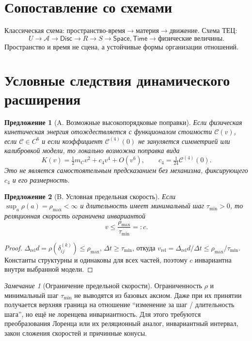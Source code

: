\documentclass[12pt,a4paper,oneside]{book}
\theoremstyle{definition}
\theoremstyle{plain}
\newtheorem{proposition}{Предложение}[chapter]
\theoremstyle{remark}
\newtheorem{remark}{Замечание}[chapter]
\newcommand{\Whole}{U}
\newcommand{\Parts}{\mathcal A}
\newcommand{\Rel}{R}
\newcommand{\State}{S}
\newcommand{\norm}{\rho}
\newcommand{\Disc}{\mathsf{Disc}}
\newcommand{\Space}{\mathsf{Space}}
\newcommand{\Time}{\mathsf{Time}}
\newcommand{\Cost}{\mathcal C}
\begin{document}
\section{Сопоставление со схемами}

Классическая схема: $\text{пространство-время}\to\text{материя}\to\text{движение}$.
Схема ТЕЦ:
\[
\Whole\to\Parts\to\Disc\to\Rel\to\State\to\Space,\Time\to\text{физические величины}.
\]
Пространство и время не сцена, а устойчивые формы организации отношений.

\section{Условные следствия динамического расширения}

\begin{proposition}[A. Возможные высокопорядковые поправки]
Если физическая кинетическая энергия отождествляется с функционалом стоимости
$\Cost(v)$, если $\Cost\in C^6$ и если коэффициент $\Cost^{(4)}(0)$ не зануляется
симметрией или калибровкой модели, то локально возможна поправка вида
\[
K(v)=\tfrac12 m_Cv^2+c_4v^4+O(v^6),
\qquad
c_4=\tfrac1{24}\Cost^{(4)}(0).
\]
Это не является самостоятельным предсказанием без механизма, фиксирующего $c_4$ и
его размерность.
\end{proposition}

\begin{proposition}[B. Условная предельная скорость]
Если $\sup_a\norm(a)=\norm_{\max}<\infty$ и длительность имеет минимальный шаг
$\tau_{\min}>0$, то реляционная скорость ограничена инвариантой
\[
v\le\frac{\norm_{\max}}{\tau_{\min}}=:c.
\]
\end{proposition}

\begin{proof}
$\Delta_{\mathrm{rel}}d=\norm(\delta_{ij}^{(k)})\le\norm_{\max}$,
$\Delta t\ge\tau_{\min}$, откуда
$v_{\mathrm{rel}}=\Delta_{\mathrm{rel}}d/\Delta t\le\norm_{\max}/\tau_{\min}$.
Константы структурны и одинаковы для всех частей, поэтому $c$ инвариантна внутри
выбранной модели.
\end{proof}

\begin{remark}[Ограничение предельной скорости]
Ограниченность $\norm$ и минимальный шаг $\tau_{\min}$ не выводятся из базовых
аксиом. Даже при их принятии получается верхняя граница на отношение
``изменение за шаг / длительность шага'', но ещё не лоренцева инвариантность. Для
этого требуются преобразования Лоренца или их реляционный аналог, инвариантный
интервал, закон сложения скоростей и причинные конусы.
\end{remark}
\end{document}
